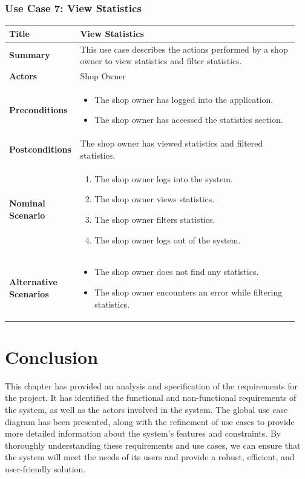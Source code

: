 \subsubsection{Use Case 7: View Statistics}
\begin{longtable}{|p{0.2\linewidth}|p{0.75\linewidth}|}
\hline
\textbf{Title} & View Statistics \\
\hline
\textbf{Summary} & This use case describes the actions performed by a shop owner to view statistics and filter statistics. \\
\hline
\textbf{Actors} & Shop Owner \\
\hline
\textbf{Preconditions} &
\begin{itemize}
    \item The shop owner has logged into the application.
    \item The shop owner has accessed the statistics section.
\end{itemize} \\
\hline
\textbf{Postconditions} & The shop owner has viewed statistics and filtered statistics. \\
\hline
\textbf{Nominal Scenario} &
\begin{enumerate}
    \item The shop owner logs into the system.
    \item The shop owner views statistics.
    \item The shop owner filters statistics.
    \item The shop owner logs out of the system.
\end{enumerate} \\
\hline
\textbf{Alternative Scenarios} &
\begin{itemize}
    \item The shop owner does not find any statistics.
    \item The shop owner encounters an error while filtering statistics.
\end{itemize} \\
\hline
\end{longtable}

\section{Conclusion}
This chapter has provided an analysis and specification of the requirements for the project. It has identified the functional and non-functional requirements of the system, as well as the actors involved in the system. The global use case diagram has been presented, along with the refinement of use cases to provide more detailed information about the system's features and constraints. By thoroughly understanding these requirements and use cases, we can ensure that the system will meet the needs of its users and provide a robust, efficient, and user-friendly solution.